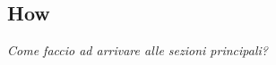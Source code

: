 \subsection{How}
\begin{center}

\textit{Come faccio ad arrivare alle sezioni principali?}

\end{center}